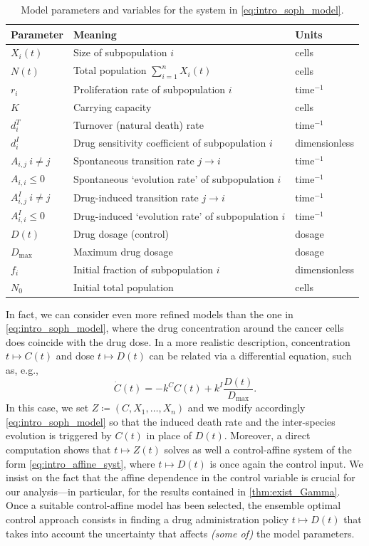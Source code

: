 \documentclass[a4paper,12pt, reqno]{amsart}
\theoremstyle{plain}
\theoremstyle{definition}
\theoremstyle{remark}
\numberwithin{equation}{section}
\begin{document}
{\begin{table}[b]
\begin{tabular}{lll}
\toprule
\textbf{Parameter} & \textbf{Meaning} & \textbf{Units} \\
\midrule
$X_i(t)$ & Size of subpopulation $i$ & cells \\
$N(t)$ & Total population $\sum_{i=1}^n X_i(t)$ & cells \\
$r_i$ & Proliferation rate of subpopulation $i$ & time$^{-1}$ \\
$K$ & Carrying capacity & cells \\
$d_i^T$ & Turnover (natural death) rate & time$^{-1}$ \\
$d_i^I$ & Drug sensitivity coefficient of subpopulation $i$ & dimensionless \\
$A_{i,j} \ i\neq j$ & Spontaneous transition rate $j \to i$ & time$^{-1}$ \\
$A_{i,i} \leq 0$ & Spontaneous `evolution rate' of subpopulation $i$ & time$^{-1}$ \\
$A^I_{i,j} \ i\neq j$ & Drug-induced transition rate $j \to i$ & time$^{-1}$ \\
$A_{i,i}^I \leq 0$ & Drug-induced `evolution rate' of subpopulation $i$ & time$^{-1}$ \\
$D(t)$ & Drug dosage (control) & dosage \\
$D_{\max}$ & Maximum drug dosage & dosage \\
$f_i$ & Initial fraction of subpopulation $i$ & dimensionless \\
$N_0$ & Initial total population & cells \\
\bottomrule
\end{tabular}
\caption{Model parameters and variables for the system in \cref{eq:intro_soph_model}.}
\label{tab:parameters}
\end{table}
In fact, we can consider even more refined models than the one in \eqref{eq:intro_soph_model}, where the drug concentration around the cancer cells does coincide with the drug dose.
In a more realistic description, concentration $t\mapsto C(t)$ and dose $t\mapsto D(t)$ can be related via a differential equation, such as, e.g.,
\begin{equation*}
    \dot C(t) = -k^C C(t) + k^I \frac{D(t)}{D_{\max}} .
\end{equation*}
In this case, we set $Z\coloneqq (C,X_1,\ldots,X_n)$ and we modify accordingly \eqref{eq:intro_soph_model} so that the induced death rate and the inter-species evolution is triggered by $C(t)$ in place of $D(t)$. Moreover, a direct computation shows that $t\mapsto Z(t)$ solves as well a control-affine system of the form \eqref{eq:intro_affine_syst}, where $t\mapsto D(t)$ is once again the control input. We insist on the fact that the affine dependence in the control variable is crucial for our analysis---in particular, for the results contained in \cref{thm:exist_Gamma}.
Once a suitable control-affine model has been selected, the ensemble optimal control approach consists in finding a drug administration policy $t\mapsto D(t)$ that takes into account the uncertainty that affects \emph{(some of)} the model parameters.}
\end{document}
